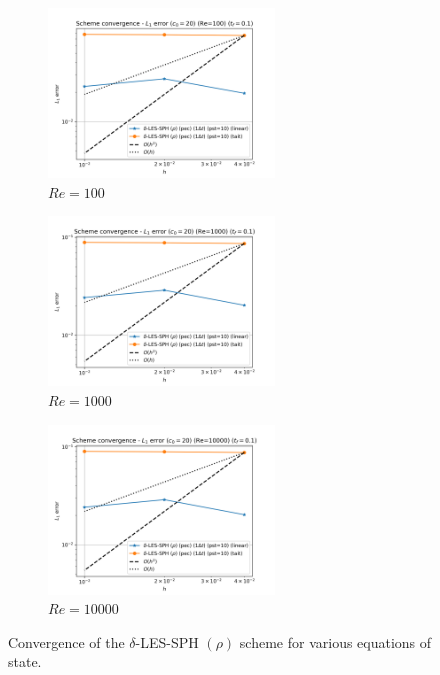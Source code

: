 \begin{figure}[H]
  \begin{subfigure}{7cm}
    \centering\includegraphics[width=6cm]{Code-Figures/deltales_sd/eos/dt_pois_conv_c0_20_re_100.png}
    \caption{$Re = 100$}
  \end{subfigure}
  \begin{subfigure}{7cm}
    \centering\includegraphics[width=6cm]{Code-Figures/deltales_sd/eos/dt_pois_conv_c0_20_re_1000.png}
    \caption{$Re = 1000$}
  \end{subfigure}
  \begin{subfigure}{7cm}
    \centering\includegraphics[width=6cm]{Code-Figures/deltales_sd/eos/dt_pois_conv_c0_20_re_10000.png}
    \caption{$Re = 10000$}
  \end{subfigure}
  \caption{Convergence of the $\delta$-LES-SPH $(\rho)$ scheme for various equations of state.}
  \label{fig:deltales_sd-eos}
\end{figure}

